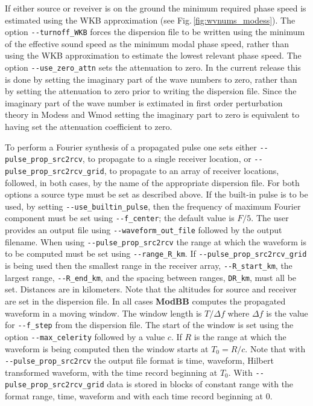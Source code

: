 If either source or reveiver is on the ground the minimum required phase speed is estimated using the WKB approximation (see Fig.\,\ref{fig:wvnums_modess}). The option \verb+--turnoff_WKB+ forces the dispersion file to be written using the minimum of the effective sound speed as the minimum modal phase speed, rather than using the WKB approximation to estimate the lowest relevant phase speed. The option \verb+--use_zero_attn+ sets the attenuation to zero. In the current release this is done by setting the imaginary part of the wave numbers to zero, rather than by setting the attenuation to zero prior to writing the dispersion file. Since the imaginary part of the wave number is extimated in first order perturbation theory in Modess and Wmod setting the imaginary part to zero is equivalent to having set the attenuation coefficient to zero. 

To perform a Fourier synthesis of a propagated pulse one sets either \verb+--pulse_prop_src2rcv+, to propagate to a single receiver location, or \verb+--pulse_prop_src2rcv_grid+, to propagate to an array of receiver locations, followed, in both cases, by the name of the appropriate dispersion file. For both options a source type must be set as described above. If the built-in pulse is to be used, by setting \verb+--use_builtin_pulse+, then the frequency of maximum Fourier component must be set using \verb+--f_center+; the default value is $F/5$. The user provides an output file using \verb+--waveform_out_file+ followed by the output filename. When using \verb+--pulse_prop_src2rcv+ the range at which the waveform is to be computed must be set using \verb+--range_R_km+. If \verb+--pulse_prop_src2rcv_grid+ is being used then the smallest range in the receiver array, \verb+--R_start_km+, the largest range, \verb+--R_end_km+, and the spacing between ranges, \verb+DR_km+, must all be set. Distances are in kilometers. Note that the altitudes for source and receiver are set in the dispersion file. In all cases {\bf ModBB} computes the propagated waveform in a moving window. The window length is $T/\Delta f$ where $\Delta f$ is the value for \verb+--f_step+ from the dispersion file. The start of the window is set using the option \verb+--max_celerity+ followed by a value $c$. If $R$ is the range at which the waveform is being computed then the window starts at $T_0=R/c$. Note that with \verb+--pulse_prop_src2rcv+ the output file format is time, waveform, Hilbert transformed waveform, with the time record beginning at $T_0$. With \verb+--pulse_prop_src2rcv_grid+ data is stored in blocks of constant range with the format range, time, waveform and with each time record beginning at 0. 

